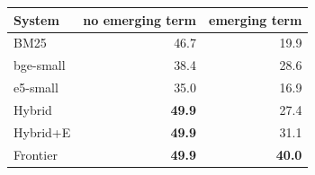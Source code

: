 \begin{tabular}{lrr}
\toprule
System & no emerging term & emerging term \\
\midrule
BM25 & 46.7 & 19.9 \\
bge-small & 38.4 & 28.6 \\
e5-small & 35.0 & 16.9 \\
Hybrid & \textbf{49.9} & 27.4 \\
Hybrid{+}E & \textbf{49.9} & 31.1 \\
Frontier & \textbf{49.9} & \textbf{40.0} \\
\bottomrule
\end{tabular}
